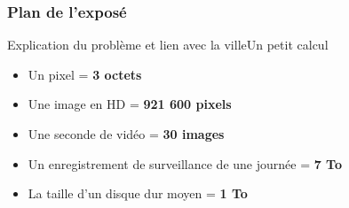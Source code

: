 \begin{frame}
    \titlepage{}
\end{frame}


\begin{frame}
    \frametitle{Plan de l'exposé} 
    \tableofcontents 
\end{frame}


%    

\begin{frame}{Explication du problème et lien avec la ville}{Un petit calcul}
    \begin{itemize}
        \item <1-> Un pixel = \textbf{3 octets}
        \item <2-> Une image en HD = \textbf{921 600 pixels}
        \item <3-> Une seconde de vidéo = \textbf{30 images}
        \item <4-> Un enregistrement de surveillance de une journée = \textbf{7 To} 
        \item <5-> La taille d'un disque dur moyen = \textbf{1 To}
    \end{itemize}
\end{frame}
